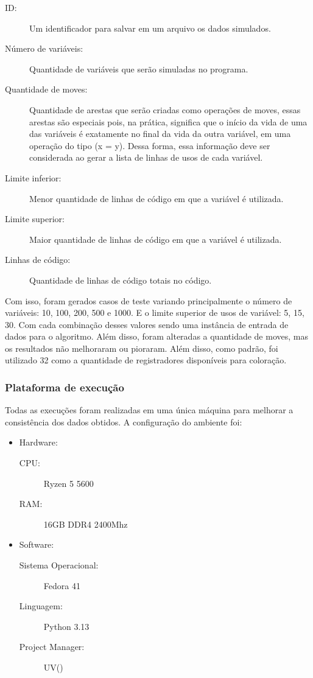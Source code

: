 \begin{description}
  \item[ID:] Um identificador para salvar em um arquivo os dados simulados.
  \item[Número de variáveis:] Quantidade de variáveis que serão simuladas no programa.
  \item[Quantidade de moves:] Quantidade de arestas que serão criadas como operações de moves, essas arestas são especiais pois, na prática, significa que o início 
    da vida de uma das variáveis é exatamente no final da vida da outra variável, em uma operação do tipo (x = y). Dessa forma, essa informação deve ser considerada
    ao gerar a lista de linhas de usos de cada variável.
  \item[Limite inferior:] Menor quantidade de linhas de código em que a variável é utilizada.
  \item[Limite superior:] Maior quantidade de linhas de código em que a variável é utilizada.
  \item[Linhas de código:] Quantidade de linhas de código totais no código.
\end{description}

Com isso, foram gerados casos de teste variando principalmente o 
número de variáveis: 10, 100, 200, 500 e 1000. E o limite superior de usos de variável: 5, 15, 30. 
Com cada combinação desses valores sendo uma instância de entrada de dados para o algoritmo. Além disso, foram alteradas a quantidade de moves, mas os resultados
não melhoraram ou pioraram. Além disso, como padrão, foi utilizado 32 como a quantidade de registradores disponíveis para coloração.

\subsubsection{Plataforma de execução}

Todas as execuções foram realizadas em uma única máquina para melhorar a consistência dos dados obtidos. A configuração do ambiente foi:

\begin{itemize}
  \item Hardware:
    \begin{description}
      \item[CPU:] Ryzen 5 5600
      \item[RAM:] 16GB DDR4 2400Mhz
    \end{description}
  \item Software:
    \begin{description}
      \item[Sistema Operacional:] Fedora 41
      \item[Linguagem:] Python 3.13
      \item[Project Manager:] UV(\textcite{uv})
    \end{description}
\end{itemize}


